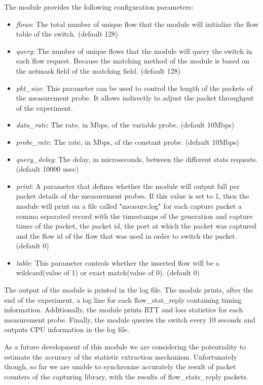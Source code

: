 \documentclass{book}
\begin{document}
  The module provides the following configuration parameters:
  \begin{itemize}
  \item \emph{flows}: The total number of unique flow that the module will
initialize the flow table of the switch. (default 128)
  \item \emph{query}: The number of unique flows that the module will query the 
  switch in each flow request. Because the matching method of the module is based 
on the netmask field of the matching field. (default 128)
  \item \emph{pkt\_size}:  This parameter can be used to control the length of the
  packets of the measurement probe. It allows indirectly to adjust the packet
  throughput of the experiment.
  \item \emph{data\_rate}: The rate, in Mbps, of the variable probe. (default
      10Mbps)
\item \emph{probe\_rate}: The rate, in Mbps, of the constant probe. (default 10Mbps)
  \item \emph{query\_delay}: The delay, in microseconds, between the different 
stats requests. (default 10000 usec) 
  \item \emph{print}: A parameter that defines whether the module will output full
  per packet details of the measurement probes. If this value is set to 1, then
  the module will print on a file called "measure.log" for each capture packet a
  comma separated record with the timestamps of the generation and capture times of the
  packet, the packet id, the port at which the packet was captured and the flow id 
of the flow that was used in order to switch the packet. (default 0)
  \item \emph{table}: This parameter controls whether the inserted flow will be
a wildcard(value of 1) or exact match(value of 0). (default 0)
  \end{itemize}

  The output of the module is printed in the log file. The module prints, after the
  end of the experiment, a log line for each flow\_stat\_reply containing timing
  information. Additionally, the module prints RTT and loss statistics for each
  measurement probe. Finally, the module queries the switch every 10 seconds and
  outputs CPU information in the log file. 

  As a future development of this module we are considering the potentiality to
  estimate the accuracy of the statistic extraction mechanism. Unfortunately
  though, so far we are unable to synchronize accurately the result of packet
  counters of the capturing library, with the results of flow\_stats\_reply 
  packets. 
\end{document}
